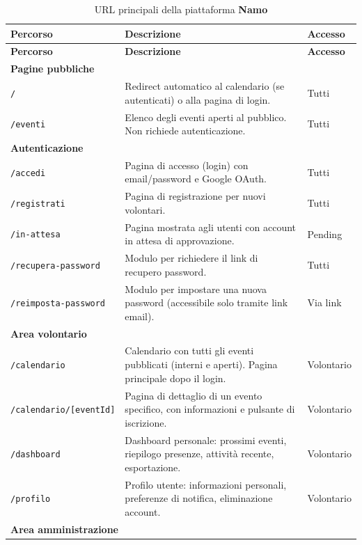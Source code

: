 \documentclass[a4paper,11pt,oneside]{book}
\newcommand{\namo}{\textbf{Namo}}
\newcommand{\percorso}[1]{\textcolor{namoCyan}{\texttt{#1}}}
\begin{document}
\begin{longtable}{l p{7cm} l}
\caption{URL principali della piattaforma \namo{}} \label{tab:url-principali} \\
\toprule
\textbf{Percorso} & \textbf{Descrizione} & \textbf{Accesso} \\
\midrule
\endfirsthead
\toprule
\textbf{Percorso} & \textbf{Descrizione} & \textbf{Accesso} \\
\midrule
\endhead
\multicolumn{3}{l}{\textbf{\textcolor{namoCyan}{Pagine pubbliche}}} \\
\midrule
\percorso{/} & Redirect automatico al calendario (se autenticati) o alla pagina di login. & Tutti \\[4pt]
\percorso{/eventi} & Elenco degli eventi aperti al pubblico. Non richiede autenticazione. & Tutti \\[4pt]
\midrule
\multicolumn{3}{l}{\textbf{\textcolor{namoCyan}{Autenticazione}}} \\
\midrule
\percorso{/accedi} & Pagina di accesso (login) con email/password e Google OAuth. & Tutti \\[4pt]
\percorso{/registrati} & Pagina di registrazione per nuovi volontari. & Tutti \\[4pt]
\percorso{/in-attesa} & Pagina mostrata agli utenti con account in attesa di approvazione. & Pending \\[4pt]
\percorso{/recupera-password} & Modulo per richiedere il link di recupero password. & Tutti \\[4pt]
\percorso{/reimposta-password} & Modulo per impostare una nuova password (accessibile solo tramite link email). & Via link \\[4pt]
\midrule
\multicolumn{3}{l}{\textbf{\textcolor{namoCyan}{Area volontario}}} \\
\midrule
\percorso{/calendario} & Calendario con tutti gli eventi pubblicati (interni e aperti). Pagina principale dopo il login. & Volontario \\[4pt]
\percorso{/calendario/[eventId]} & Pagina di dettaglio di un evento specifico, con informazioni e pulsante di iscrizione. & Volontario \\[4pt]
\percorso{/dashboard} & Dashboard personale: prossimi eventi, riepilogo presenze, attivit\`a recente, esportazione. & Volontario \\[4pt]
\percorso{/profilo} & Profilo utente: informazioni personali, preferenze di notifica, eliminazione account. & Volontario \\[4pt]
\midrule
\multicolumn{3}{l}{\textbf{\textcolor{namoCyan}{Area amministrazione}}} \\

\end{longtable}
\end{document}
